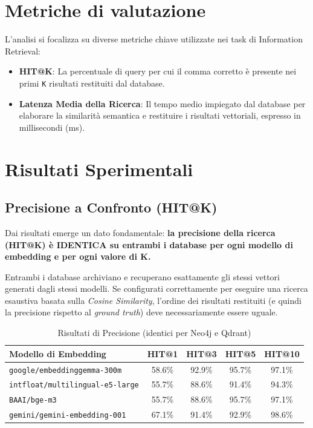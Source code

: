 \section{Metriche di valutazione}
L'analisi si focalizza su diverse metriche chiave utilizzate nei task di Information Retrieval:
\begin{itemize}
    \item \textbf{HIT@K}: La percentuale di query per cui il comma corretto è presente nei primi \texttt{K} risultati restituiti dal database.
    \item \textbf{Latenza Media della Ricerca}: Il tempo medio impiegato dal database per elaborare la similarità semantica e restituire i risultati vettoriali, espresso in millisecondi (ms).
\end{itemize}

\section{Risultati Sperimentali}

\subsection{Precisione a Confronto (HIT@K)}

Dai risultati emerge un dato fondamentale: \textbf{la precisione della ricerca (HIT@K) è IDENTICA su entrambi i database per ogni modello di embedding e per ogni valore di K.}

Entrambi i database archiviano e recuperano esattamente gli stessi vettori generati dagli stessi modelli. Se configurati correttamente per eseguire una ricerca esaustiva basata sulla \textit{Cosine Similarity}, l'ordine dei risultati restituiti (e quindi la precisione rispetto al \textit{ground truth}) deve necessariamente essere uguale.

\begin{table}[H]
    \centering
    \begin{tabular}{lcccc}
        \toprule
        \textbf{Modello di Embedding} & \textbf{HIT@1} & \textbf{HIT@3} & \textbf{HIT@5} & \textbf{HIT@10} \\
        \midrule
        \texttt{google/embeddinggemma-300m} & 58.6\% & 92.9\% & 95.7\% & 97.1\% \\
        \texttt{intfloat/multilingual-e5-large} & 55.7\% & 88.6\% & 91.4\% & 94.3\% \\
        \texttt{BAAI/bge-m3} & 55.7\% & 88.6\% & 95.7\% & 97.1\% \\
        \texttt{gemini/gemini-embedding-001} & 67.1\% & 91.4\% & 92.9\% & 98.6\% \\
        \bottomrule
    \end{tabular}
    \caption{Risultati di Precisione (identici per Neo4j e Qdrant)}
    \label{tab:precisione}
\end{table}

